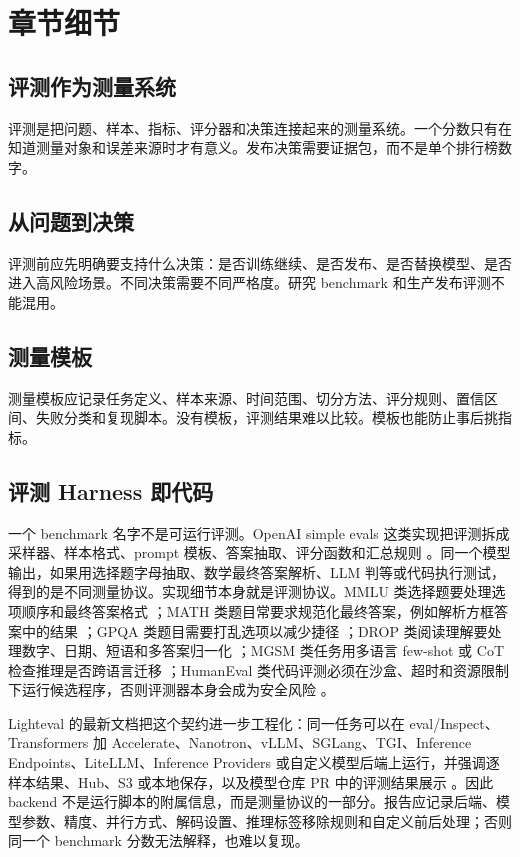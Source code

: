 \documentclass[UTF8,zihao=-4,openany]{ctexbook}
\begin{document}
\section{章节细节}
\subsection{评测作为测量系统}
评测是把问题、样本、指标、评分器和决策连接起来的测量系统。一个分数只有在知道测量对象和误差来源时才有意义。发布决策需要证据包，而不是单个排行榜数字。

\subsection{从问题到决策}
评测前应先明确要支持什么决策：是否训练继续、是否发布、是否替换模型、是否进入高风险场景。不同决策需要不同严格度。研究 benchmark 和生产发布评测不能混用。

\subsection{测量模板}
测量模板应记录任务定义、样本来源、时间范围、切分方法、评分规则、置信区间、失败分类和复现脚本。没有模板，评测结果难以比较。模板也能防止事后挑指标。

\subsection{评测 Harness 即代码}
一个 benchmark 名字不是可运行评测。OpenAI simple evals 这类实现把评测拆成采样器、样本格式、prompt 模板、答案抽取、评分函数和汇总规则 \cite{openai2024simpleevals}。同一个模型输出，如果用选择题字母抽取、数学最终答案解析、LLM 判等或代码执行测试，得到的是不同测量协议。实现细节本身就是评测协议。MMLU 类选择题要处理选项顺序和最终答案格式 \cite{hendrycks2020measuring}；MATH 类题目常要求规范化最终答案，例如解析方框答案中的结果 \cite{hendrycks2021math}；GPQA 类题目需要打乱选项以减少捷径 \cite{rein2023gpqa}；DROP 类阅读理解要处理数字、日期、短语和多答案归一化 \cite{dua2019drop}；MGSM 类任务用多语言 few-shot 或 CoT 检查推理是否跨语言迁移 \cite{shi2022mgsm}；HumanEval 类代码评测必须在沙盒、超时和资源限制下运行候选程序，否则评测器本身会成为安全风险 \cite{chen2021codex}。

Lighteval 的最新文档把这个契约进一步工程化：同一任务可以在 eval/Inspect、Transformers 加 Accelerate、Nanotron、vLLM、SGLang、TGI、Inference Endpoints、LiteLLM、Inference Providers 或自定义模型后端上运行，并强调逐样本结果、Hub、S3 或本地保存，以及模型仓库 PR 中的评测结果展示 \cite{huggingface2026lighteval,huggingface2026lightevalquicktour}。因此 backend 不是运行脚本的附属信息，而是测量协议的一部分。报告应记录后端、模型参数、精度、并行方式、解码设置、推理标签移除规则和自定义前后处理；否则同一个 benchmark 分数无法解释，也难以复现。
\end{document}
